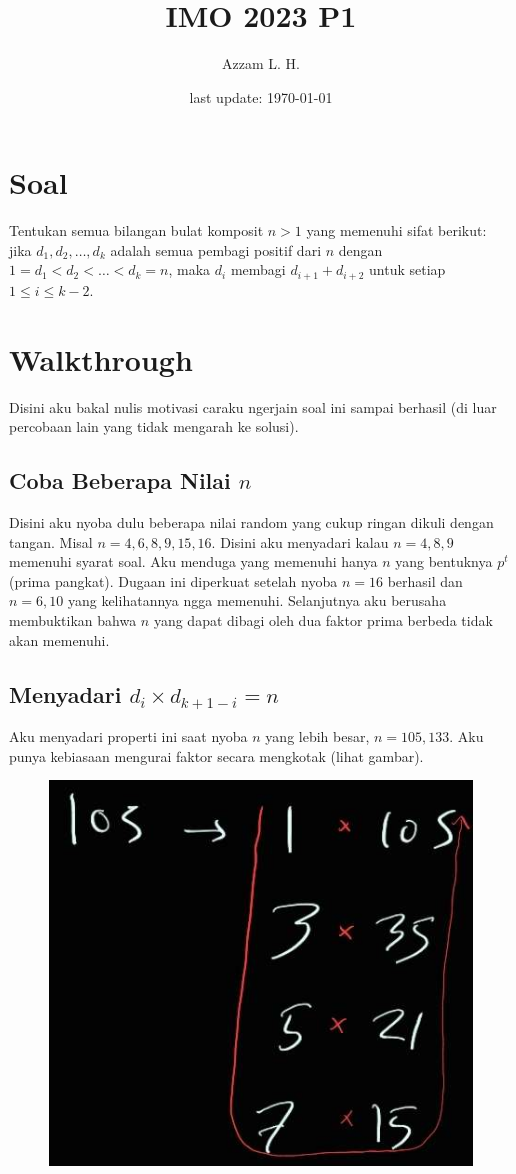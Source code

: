 \documentclass[12pt]{scrartcl}
\title{IMO 2023 P1}
\author{Azzam L. H.}
\date{last update: \today}
\begin{document}
\maketitle
\pagestyle{plain}
\vspace{-1.5cm}
\section{Soal}
Tentukan semua bilangan bulat komposit $n > 1$ yang memenuhi sifat berikut: jika
$d_1, d_2, \dots, d_k$ adalah semua pembagi positif dari $n$ dengan $1 = d_1 < d_2 < \dots < d_k = n$, maka
$d_i$ membagi $d_{i+1} + d_{i+2}$ untuk setiap $1 \le i \le k - 2$.

\newpage
\section{Walkthrough}
Disini aku bakal nulis motivasi caraku ngerjain soal ini sampai berhasil (di luar percobaan lain yang tidak mengarah ke solusi).
\subsection{Coba Beberapa Nilai $n$}
Disini aku nyoba dulu beberapa nilai random yang cukup ringan dikuli dengan tangan. Misal $n=4,6,8,9,15,16$. Disini aku menyadari kalau $n=4,8,9$ memenuhi syarat soal. Aku menduga yang memenuhi hanya $n$ yang bentuknya $p^t$ (prima pangkat). Dugaan ini diperkuat setelah nyoba $n=16$ berhasil dan $n=6,10$ yang kelihatannya ngga memenuhi. Selanjutnya aku berusaha membuktikan bahwa $n$ yang dapat dibagi oleh dua faktor prima berbeda tidak akan memenuhi.

\subsection{Menyadari $d_{i} \times d_{k+1-i}=n$}
Aku menyadari properti ini saat nyoba $n$ yang lebih besar, $n=105,133$. Aku punya kebiasaan mengurai faktor secara mengkotak (lihat gambar).

\begin{figure}[h]
\includegraphics[scale=0.3]{sc_kotak}
\centering
\end{figure}
\end{document}
